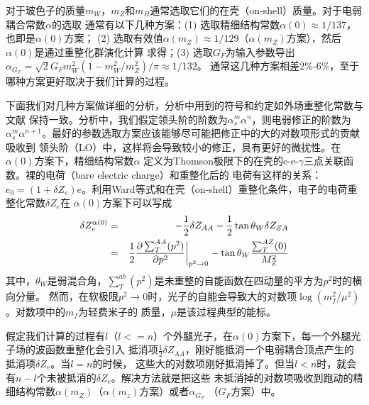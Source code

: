对于玻色子的质量$m_W$，$m_Z$和$m_H$通常选取它们的在壳（on-shell）质量。对于电弱耦合常数$\alpha$的选取
通常有以下几种方案：(1) 选取精细结构常数$\alpha(0)\approx 1/137$，也即是$\alpha(0)$方案；
(2) 选取有效值$\alpha(m_Z)\approx 1/129$（$\alpha(m_Z)$方案），然后$\alpha(0)$是通过重整化群演化计算
求得；(3) 选取$G_F$为输入参数导出$\alpha_{G_F} = \sqrt{2}G_F m^2_W(1-m^2_W/m^2_Z)/\pi \approx 1/132$。
通常这几种方案相差2\%-6\%，至于哪种方案更好取决于我们计算的过程。

下面我们对几种方案做详细的分析，分析中用到的符号和约定如外场重整化常数与文献\cite{Denner:EWPhysics}
保持一致。分析中，我们假定领头阶的阶数为$\alpha^m_s\alpha^n$，则电弱修正的阶数为
$\alpha^m_s\alpha^{n+1}$。最好的参数选取方案应该能够尽可能把修正中的大的对数项形式的贡献吸收到
领头阶（LO）中，这样将会导致较小的修正，具有更好的微扰性。在$\alpha(0)$方案下，精细结构常数$\alpha$
定义为Thomson极限下的在壳的e-e-$\gamma$三点关联函数。裸的电荷（bare electric charge）和重整化后的
电荷有这样的关系：
$e_0 = (1+\delta Z_e)e$。利用Ward等式和在壳（on-shell）重整化条件，电子的电荷重整化常数$\delta Z_e$在
$\alpha(0)$方案下可以写成\cite{Denner:EWPhysics}
\begin{eqnarray}
\delta Z^{\alpha(0)}_e &=& -\frac{1}{2}\delta Z_{AA} - \frac{1}{2} \tan\theta_W \delta Z_{ZA}
\nonumber \\
&=&
\frac{1}{2}\frac{\partial \sum^{AA}_T(p^2) }{\partial p^2}\bigg{|}_{p^2\to 0} - \tan\theta_W \frac{\sum^{AZ}_T(0)}{M^2_Z}
\end{eqnarray}
其中，$\theta_W$是弱混合角，$\sum^{ab}_T(p^2)$是未重整的自能函数在四动量的平方为$p^2$时的横向分量。
然而，在软极限$p^2\to 0$时，光子的自能会导致大的对数项$\log(m^2_f/\mu^2)$。对数项中的$m_f$为轻费米子的
质量，$\mu$是该过程典型的能标。

假定我们计算的过程有$l$（$l<=n$）个外腿光子，在$\alpha(0)$方案下，每一个外腿光子场的波函数重整化会引入
抵消项$\frac{1}{2}\delta Z_{AA}$，刚好能抵消一个电弱耦合顶点产生的抵消项$\delta Z_e$。当$l=n$的时候，
这些大的对数项刚好抵消掉了。但当$l < n$时，就会有$n-l$个未被抵消的$\delta Z_e$。解决方法就是把这些
未抵消掉的对数项吸收到跑动的精细结构常数$\alpha(m_Z)$（$\alpha(m_z)$方案）或者$\alpha_{G_F}$
（$G_F$方案）中。


